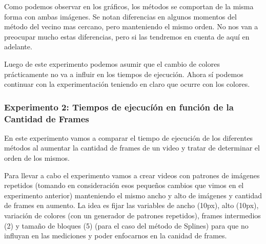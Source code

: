 \par Como podemos observar en los gr\'aficos, los m\'etodos se comportan de la misma forma con ambas im\'agenes. Se notan diferencias en algunos momentos del m\'etodo del vecino mas cercano, pero manteniendo el mismo orden. No nos van a preocupar mucho estas diferencias, pero si las tendremos en cuenta de aqu\'i en adelante.
\par Luego de este experimento podemos asumir que el cambio de colores pr\'acticamente no va a influir en los tiempos de ejecuci\'on. Ahora s\'i podemos continuar con la experimentaci\'on teniendo en claro que ocurre con los colores.


\subsubsection{Experimento 2: Tiempos de ejecucí\'on en funci\'on de la Cantidad de Frames}
\par En este experimento vamos a comparar el tiempo de ejecuci\'on de los diferentes m\'etodos al aumentar la cantidad de frames de un video y tratar de determinar el orden de los mismos.

\par Para llevar a cabo el experimento vamos a crear videos con patrones de im\'agenes repetidos (tomando en consideraci\'on esos pequeños cambios que vimos en el experimento anterior) manteniendo el mismo ancho y alto de im\'agenes y cantidad de frames en aumento. La idea es fijar las variables de ancho (10px), alto (10px), variaci\'on de colores (con un generador de patrones repetidos), frames intermedios (2) y tama\~no de bloques (5) (para el caso del m\'etodo de Splines) para que no influyan en las mediciones y poder enfocarnos en la canidad de frames.

